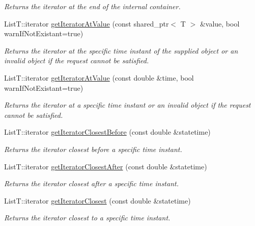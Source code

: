 \begin{DoxyCompactItemize}
\begin{DoxyCompactList}\small\item\em Returns the iterator at the end of the internal container. \end{DoxyCompactList}\item 
List\-T\-::iterator \hyperlink{classmsf__core_1_1SortedContainer_a3ca27ff6fae8916a88a6690b9c8365a9}{get\-Iterator\-At\-Value} (const shared\-\_\-ptr$<$ T $>$ \&value, bool warn\-If\-Not\-Existant=true)
\begin{DoxyCompactList}\small\item\em Returns the iterator at the specific time instant of the supplied object or an invalid object if the request cannot be satisfied. \end{DoxyCompactList}\item 
List\-T\-::iterator \hyperlink{classmsf__core_1_1SortedContainer_a727a60e4eb00ab45b2a39c8c069d2fcf}{get\-Iterator\-At\-Value} (const double \&time, bool warn\-If\-Not\-Existant=true)
\begin{DoxyCompactList}\small\item\em Returns the iterator at a specific time instant or an invalid object if the request cannot be satisfied. \end{DoxyCompactList}\item 
List\-T\-::iterator \hyperlink{classmsf__core_1_1SortedContainer_a4cbd2aeae2f6dde2dfd0dceea4a8e928}{get\-Iterator\-Closest\-Before} (const double \&statetime)
\begin{DoxyCompactList}\small\item\em Returns the iterator closest before a specific time instant. \end{DoxyCompactList}\item 
List\-T\-::iterator \hyperlink{classmsf__core_1_1SortedContainer_a3c1f848e9874f9bdc4ab12645e699fcf}{get\-Iterator\-Closest\-After} (const double \&statetime)
\begin{DoxyCompactList}\small\item\em Returns the iterator closest after a specific time instant. \end{DoxyCompactList}\item 
List\-T\-::iterator \hyperlink{classmsf__core_1_1SortedContainer_a64ce9fdfdd6220f78187e7270f689f02}{get\-Iterator\-Closest} (const double \&statetime)
\begin{DoxyCompactList}\small\item\em Returns the iterator closest to a specific time instant. \end{DoxyCompactList}\item 

\end{DoxyCompactItemize}
